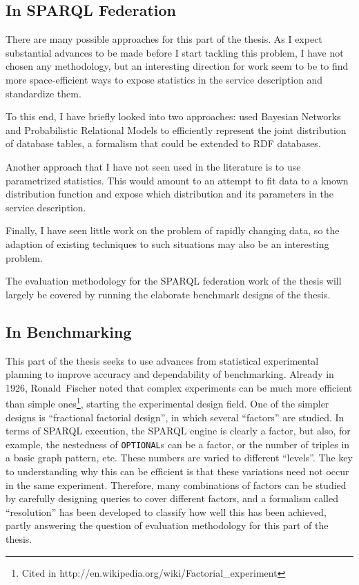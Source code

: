 \documentclass{llncs}
\begin{document}
\subsection{In SPARQL Federation}

There are many possible approaches for this part of the thesis. As I
expect substantial advances to be made before I start tackling this
problem, I have not chosen any methodology, but an interesting
direction for work seem to be to find more space-efficient ways to
expose statistics in the service description and standardize them.

To this end, I have briefly looked into two approaches:
\cite{Getoor:2001:SEU:375663.375727} used Bayesian Networks and
Probabilistic Relational Models to efficiently represent the joint
distribution of database tables, a formalism that could be extended to
RDF databases.

Another approach that I have not seen used in the literature is to use
parametrized statistics. This would amount to an attempt to fit data to
a known distribution function and expose which distribution and its
parameters in the service description.

Finally, I have seen little work on the problem of rapidly changing
data, so the adaption of existing techniques to such situations may
also be an interesting problem.

The evaluation methodology for the SPARQL federation work of the
thesis will largely be covered by running the elaborate benchmark
designs of the thesis.

\subsection{In Benchmarking}\label{sec:benchmethod}

This part of the thesis seeks to use advances from statistical
experimental planning to improve accuracy and dependability of
benchmarking. Already in 1926, Ronald~Fischer noted that complex
experiments can be much more efficient than simple ones\footnote{Cited
  in http://en.wikipedia.org/wiki/Factorial\_experiment}, starting the
experimental design field. One of the simpler designs is ``fractional
factorial design'', in which several ``factors'' are studied. In terms
of SPARQL execution, the SPARQL engine is clearly a factor, but also,
for example, the nestedness of \texttt{OPTIONAL}s can be a factor,
or the number of triples in a basic graph pattern, etc. These numbers are
varied to different ``levels''. The key to understanding why this can
be efficient is that these variations need not occur in the same
experiment. Therefore, many combinations of factors can be studied by
carefully designing queries to cover different factors, and a
formalism called ``resolution'' has been developed to classify how
well this has been achieved, partly answering the question of
evaluation methodology for this part of the thesis.
\end{document}
